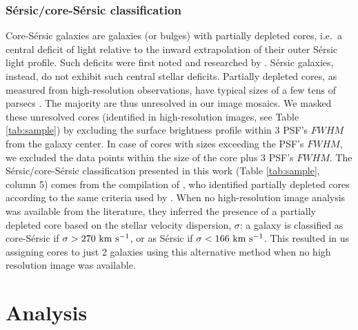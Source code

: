 \documentclass[preprint2]{emulateapj}
\begin{document}
\subsubsection{S\'ersic/core-S\'ersic classification}
\label{sec:corser}
Core-S\'ersic galaxies \citep{grahamguzman2003,graham2003coresersicmodel,trujillo2004coresersicmodel} are galaxies (or bulges) 
with partially depleted cores, 
i.e.~a central deficit of light relative to the inward extrapolation of their outer S\'ersic light profile. 
Such deficits were first noted and researched by \cite{kingminkowski1966}.
S\'ersic galaxies, instead, do not exhibit such central stellar deficits.
Partially depleted cores, as measured from high-resolution observations, have typical sizes of a few tens of parsecs
\citep{dullograham2013cores,rusli2013}.
The majority are thus unresolved in our image mosaics. 
We masked these unresolved cores (identified in high-resolution images, see Table \ref{tab:sample}) by excluding the surface brightness profile 
within 3 PSF's $FWHM$ from the galaxy center.
In case of cores with sizes exceeding the PSF's $FWHM$, we excluded the data points within the size of the core 
plus 3 PSF's $FWHM$.
The S\'ersic/core-S\'ersic classification presented in this work (Table \ref{tab:sample}, column 5)
comes from the compilation of \citet{savorgnangraham2014},
who identified partially depleted cores according to the same criteria used by \citet{grahamscott2013}.
When no high-resolution image analysis was available from the literature, 
they inferred the presence of a partially depleted core based on the stellar velocity dispersion, $\sigma$:
a galaxy is classified as core-S\'ersic if $\sigma > 270\rm~km~s^{-1}$,
or as S\'ersic if $\sigma < 166\rm~km~s^{-1}$.
This resulted in us assigning cores to just 2 galaxies using this alternative method when 
no high resolution image was available.

\section{Analysis}
\label{sec:anal}
\end{document}
